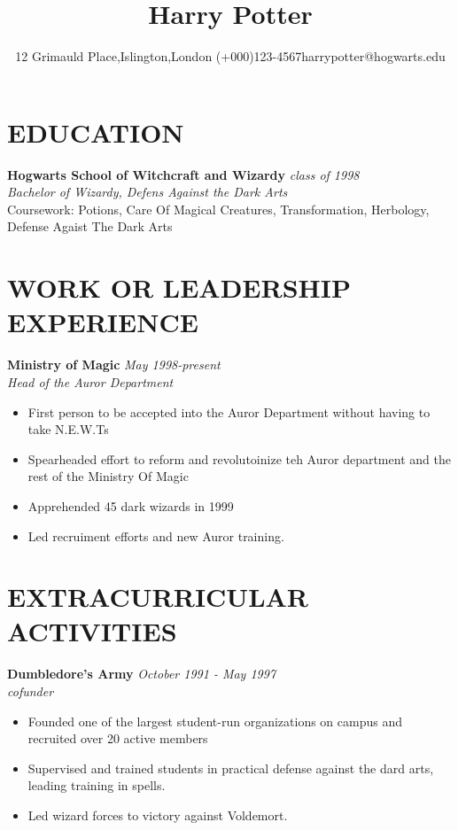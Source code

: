 \documentclass[12pt,letterpaper,two side]{article}
\begin{document}
\title{Harry Potter}
\author{12 Grimauld Place,Islington,London \vert (+000)123-4567\vert harrypotter@hogwarts.edu}
\date{}
\maketitle



\section*{EDUCATION}

{\bf Hogwarts School of Witchcraft and Wizardy} \hfill {\em class of 1998} 
\\ \textit{Bachelor of Wizardy, Defens Against the Dark Arts}
\\ Coursework: Potions, Care Of Magical Creatures, Transformation, Herbology, Defense Agaist The Dark Arts\\



\section*{WORK OR LEADERSHIP EXPERIENCE}

{\bf Ministry of Magic } \hfill {\em May 1998-present } 
\\ \textit{Head of the Auror Department}
 \begin{itemize}
    \item First person to be accepted into the Auror Department without having to take N.E.W.Ts
    \item Spearheaded effort to reform and revolutoinize teh Auror department and the rest of the Ministry Of Magic
    \item Apprehended 45 dark wizards in 1999
    \item Led recruiment efforts and new Auror training.
\end{itemize}


\section*{EXTRACURRICULAR ACTIVITIES}

{\bf Dumbledore's Army } \hfill {\em October 1991 - May 1997} 
\\ \textit{cofunder}
 \begin{itemize}
    \item Founded one of the largest student-run organizations on campus and recruited over 20 active members
    \item Supervised and trained students in practical defense against the dard arts, leading training in spells.
    \item Led wizard forces to victory against Voldemort.
\end{itemize}
\end{document}
